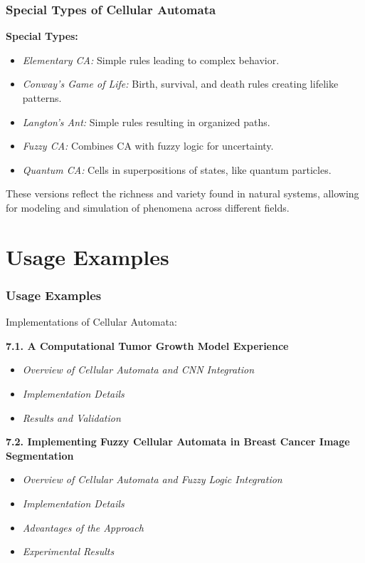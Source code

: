 \documentclass{beamer}
\begin{document}
\begin{frame}
    \frametitle{Special Types of Cellular Automata}
    \textbf{Special Types:}
    \begin{itemize}
        \item \textit{Elementary CA:} Simple rules leading to complex behavior.
        \item \textit{Conway’s Game of Life:} Birth, survival, and death rules creating lifelike patterns.
        \item \textit{Langton’s Ant:} Simple rules resulting in organized paths.
        \item \textit{Fuzzy CA:} Combines CA with fuzzy logic for uncertainty.
        \item \textit{Quantum CA:} Cells in superpositions of states, like quantum particles.
    \end{itemize}
    These versions reflect the richness and variety found in natural systems, allowing for modeling and simulation of phenomena across different fields.
\end{frame}

\section{Usage Examples}
\begin{frame}
    \frametitle{Usage Examples}
    Implementations of Cellular Automata:
    
    \textbf{7.1. A Computational Tumor Growth Model Experience}
    \begin{itemize}
        \item \textit{Overview of Cellular Automata and CNN Integration}
        \item \textit{Implementation Details}
        \item \textit{Results and Validation}
    \end{itemize}
    
    \textbf{7.2. Implementing Fuzzy Cellular Automata in Breast Cancer Image Segmentation}
    \begin{itemize}
        \item \textit{Overview of Cellular Automata and Fuzzy Logic Integration}
        \item \textit{Implementation Details}
        \item \textit{Advantages of the Approach}
        \item \textit{Experimental Results}
    \end{itemize}
\end{frame}
\end{document}
